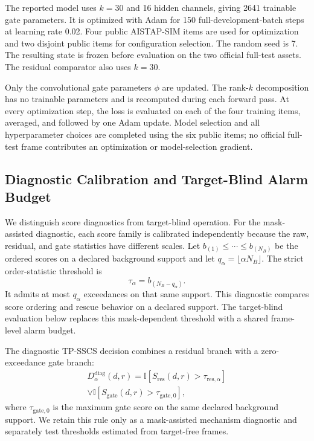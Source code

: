 \documentclass[journal]{IEEEtran}
\begin{document}
The reported model uses $k=30$ and 16 hidden channels, giving 2641 trainable gate parameters. It is optimized with Adam for 150 full-development-batch steps at learning rate 0.02. Four public AISTAP-SIM items are used for optimization and two disjoint public items for configuration selection. The random seed is 7. The resulting state is frozen before evaluation on the two official full-test assets. The residual comparator also uses $k=30$.

Only the convolutional gate parameters $\phi$ are updated. The rank-$k$ decomposition has no trainable parameters and is recomputed during each forward pass. At every optimization step, the loss is evaluated on each of the four training items, averaged, and followed by one Adam update. Model selection and all hyperparameter choices are completed using the six public items; no official full-test frame contributes an optimization or model-selection gradient.

\subsection{Diagnostic Calibration and Target-Blind Alarm Budget}

We distinguish score diagnostics from target-blind operation. For the mask-assisted diagnostic, each score family is calibrated independently because the raw, residual, and gate statistics have different scales. Let $b_{(1)}\leq\cdots\leq b_{(N_B)}$ be the ordered scores on a declared background support and let $q_{\alpha}=\lfloor\alpha N_B\rfloor$. The strict order-statistic threshold is
\begin{equation}
    \tau_{\alpha}=b_{(N_B-q_{\alpha})}.
\end{equation}
It admits at most $q_{\alpha}$ exceedances on that same support. This diagnostic compares score ordering and rescue behavior on a declared support. The target-blind evaluation below replaces this mask-dependent threshold with a shared frame-level alarm budget.

The diagnostic TP-SSCS decision combines a residual branch with a zero-exceedance gate branch:
\begin{multline}
    D^{\mathrm{diag}}_{\alpha}(d,r)=
    \mathbb I[S_{\mathrm{res}}(d,r)>\tau_{\mathrm{res},\alpha}] \\
    \lor
    \mathbb I[S_{\mathrm{gate}}(d,r)>\tau_{\mathrm{gate},0}],
    \label{eq:union-decision}
\end{multline}
where $\tau_{\mathrm{gate},0}$ is the maximum gate score on the same declared background support. We retain this rule only as a mask-assisted mechanism diagnostic and separately test thresholds estimated from target-free frames.
\end{document}
